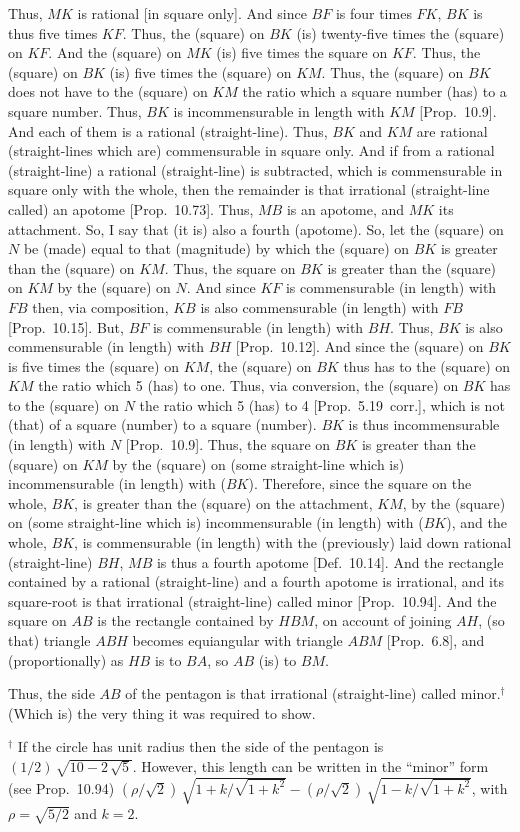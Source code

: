\begin{Parallel}{}{}
{Thus, $MK$ is rational [in square only]. And since $BF$ is four times
$FK$, $BK$ is thus five times $KF$. Thus, the (square) on $BK$
(is) twenty-five times the (square) on $KF$.  And the (square) on $MK$
(is) five times the square on $KF$. Thus, the (square) on $BK$ (is) five
times the (square) on $KM$.  Thus, the (square) on $BK$ does not
have to the (square) on $KM$ the ratio which a square number (has) to
a square number. Thus, $BK$ is incommensurable in length with $KM$ [Prop.~10.9].
And each of them is a rational (straight-line).  Thus, $BK$ and $KM$ are rational
(straight-lines which are) commensurable in square only. And if from a rational (straight-line)
a rational (straight-line) is subtracted, which is commensurable in square
only with the whole, then the remainder is that irrational (straight-line
called) an apotome [Prop.~10.73]. Thus, $MB$ is an apotome, and $MK$ its attachment. So, I say that (it is) also a fourth (apotome). So, let the
(square) on $N$ be (made) equal to that (magnitude) by which the (square)
on $BK$ is greater than the (square) on $KM$. Thus, the
square on $BK$ is greater than the (square) on $KM$ by the (square) on $N$.
And since $KF$ is commensurable (in length) with $FB$ then, via composition, 
$KB$ is also commensurable (in length) with $FB$ [Prop.~10.15]. But, $BF$ is commensurable (in length)
with $BH$. Thus, $BK$ is also commensurable (in length) with $BH$ [Prop.~10.12]. And since the
(square) on $BK$ is five times the (square) on $KM$, the (square) on $BK$
thus has to the (square) on $KM$ the ratio which 5 (has) to one. Thus, via
conversion, the (square) on $BK$ has to the (square) on $N$ the ratio
which 5 (has) to 4 [Prop.~5.19~corr.], which is not (that) of a
square (number) to a square (number). $BK$ is thus incommensurable (in length)
with $N$ [Prop.~10.9]. Thus, the square on $BK$ is greater than
the (square) on $KM$ by the (square) on (some straight-line which is) incommensurable (in length) with ($BK$). Therefore, since the square on the whole,
$BK$, is greater than the (square) on the attachment, $KM$, by the
(square) on (some straight-line which is) incommensurable (in length) with ($BK$),
and the whole, $BK$, is commensurable (in length) with the (previously) laid down
rational (straight-line) $BH$, $MB$ is thus a fourth apotome
[Def.~10.14]. And the rectangle contained by a rational (straight-line)
and a fourth apotome is irrational, and its square-root is that irrational
(straight-line) called minor [Prop.~10.94]. And the square on $AB$
is the rectangle contained by $HBM$, on account of joining $AH$, (so that)
triangle $ABH$ becomes equiangular  with triangle $ABM$ [Prop.~6.8], and (proportionally) as
$HB$ is to $BA$, so $AB$ (is) to $BM$.

Thus, the side $AB$ of the pentagon is that irrational (straight-line)
called minor.$^\dag$ (Which is) the very thing it was required to show.}
\end{Parallel}
{\footnotesize\noindent$^\dag$ If the circle has unit radius then the side of the pentagon is $(1/2)\,\sqrt{10-2\,\sqrt{5}}$. However, this length can
be written in the ``minor'' form (see Prop.~10.94) $(\rho/\sqrt{2})\,\sqrt{1+k/\sqrt{1+k^2}} - (\rho/\sqrt{2})\,\sqrt{1-k/\sqrt{1+k^2}}$, with $\rho=\sqrt{5/2}$ and $k=2$.}

